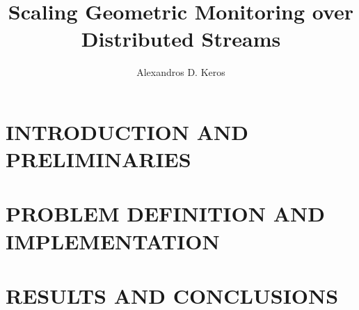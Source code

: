 \documentclass[ee, msthesis]{usuthesis}
\author{Alexandros D. Keros}
\title{Scaling Geometric Monitoring over Distributed Streams}
\begin{document}
    \preliminaries   %

    \maketitle
    \makecopyright        %

    
    

    \tableofcontents
    \listoftables
    \listoffigures

    \body  %

	\part{INTRODUCTION AND PRELIMINARIES} \label{pt:introPrelim}    
    
    
    
    \part{PROBLEM DEFINITION AND IMPLEMENTATION} \label{pt:probDefImpl}
    
    
    \part{RESULTS AND CONCLUSIONS} \label{pt:resConc}
    
    
    
	
\end{document}
